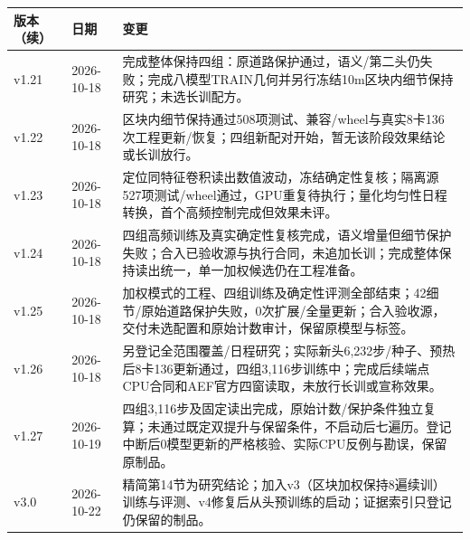 \documentclass[UTF8,fontset=fandol,zihao=5,a4paper]{ctexart}
\begin{document}
\noindent\begin{tabularx}{\linewidth}{@{}p{2cm}p{2.8cm}Y@{}}
\toprule 版本（续） & 日期 & 变更\\\midrule
v1.21 & 2026-10-18 & 完成整体保持四组：原道路保护通过，语义/第二头仍失败；完成八模型TRAIN几何并另行冻结10m区块内细节保持研究；未选长训配方。\\
v1.22 & 2026-10-18 & 区块内细节保持通过508项测试、兼容/wheel与真实8卡136次工程更新/恢复；四组新配对开始，暂无该阶段效果结论或长训放行。\\
v1.23 & 2026-10-18 & 定位同特征卷积读出数值波动，冻结确定性复核；隔离源527项测试/wheel通过，GPU重复待执行；量化均匀性日程转换，首个高频控制完成但效果未评。\\
v1.24 & 2026-10-18 & 四组高频训练及真实确定性复核完成，语义增量但细节保护失败；合入已验收源与执行合同，未追加长训；完成整体保持读出统一，单一加权候选仍在工程准备。\\
v1.25 & 2026-10-18 & 加权模式的工程、四组训练及确定性评测全部结束；42细节/原始道路保护失败，0次扩展/全量更新；合入验收源，交付未选配置和原始计数审计，保留原模型与标签。\\
v1.26 & 2026-10-18 & 另登记全范围覆盖/日程研究；实际新头6,232步/种子、预热后8卡136更新通过，四组3,116步训练中；完成后续端点CPU合同和AEF官方四窗读取，未放行长训或宣称效果。\\
v1.27 & 2026-10-19 & 四组3,116步及固定读出完成，原始计数/保护条件独立复算；未通过既定双提升与保留条件，不启动后七遍历。登记中断后0模型更新的严格核验、实际CPU反例与勘误，保留原制品。\\\bottomrule
v3.0 & 2026-10-22 & 精简第14节为研究结论；加入v3（区块加权保持8遍续训）训练与评测、v4修复后从头预训练的启动；证据索引只登记仍保留的制品。\\\bottomrule
\end{tabularx}
\end{document}
